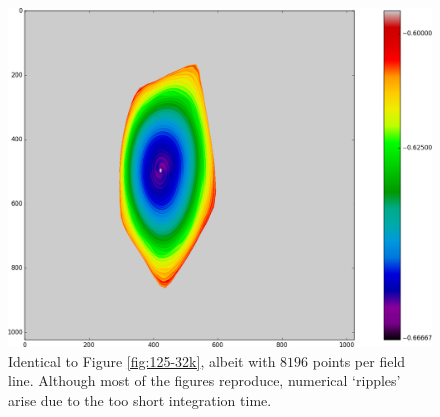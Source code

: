 \documentclass{article}
\begin{document}
\begin{figure}[!htb]
\endminipage\hfill
{}
  \includegraphics[width=\linewidth]{Figures/Rings_Papertwist_twist1_125_steps8k.png}
	\caption{Identical to Figure \ref{fig:125-32k}, albeit with $8196$ points per field line. Although most of the figures reproduce, numerical `ripples' arise due to the too short integration time.}\label{fig:125-8k}
\endminipage
\end{figure}
\end{document}
